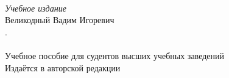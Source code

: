 \newpage
\thispagestyle{empty}
~\vfill
\begin{centering}
  \textit{Учебное издание}\\[18pt]
  Великодный Вадим Игоревич\\[6pt]
  \textsc{\Title. \SubTitle}\\[6pt]
  \PubType\\[18pt]
  Учебное пособие для судентов высших учебных заведений\\[18pt]
  Издаётся в авторской редакции\\
\end{centering}
\vspace{3cm}
